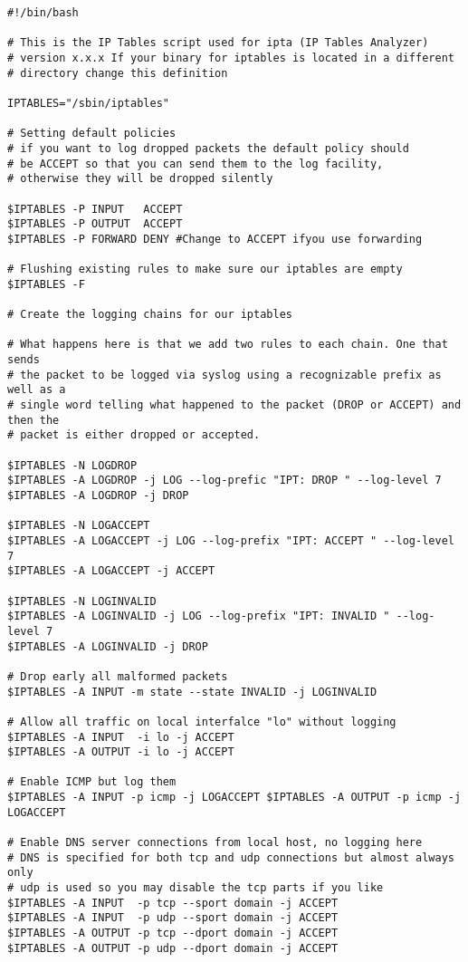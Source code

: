 \documentclass[english,twoside,openright,a4paper,12pt]{article}
\begin{document}
\begin{verbatim}
#!/bin/bash

# This is the IP Tables script used for ipta (IP Tables Analyzer) 
# version x.x.x If your binary for iptables is located in a different 
# directory change this definition

IPTABLES="/sbin/iptables"

# Setting default policies
# if you want to log dropped packets the default policy should 
# be ACCEPT so that you can send them to the log facility, 
# otherwise they will be dropped silently 

$IPTABLES -P INPUT   ACCEPT
$IPTABLES -P OUTPUT  ACCEPT
$IPTABLES -P FORWARD DENY #Change to ACCEPT ifyou use forwarding

# Flushing existing rules to make sure our iptables are empty 
$IPTABLES -F

# Create the logging chains for our iptables

# What happens here is that we add two rules to each chain. One that sends
# the packet to be logged via syslog using a recognizable prefix as well as a 
# single word telling what happened to the packet (DROP or ACCEPT) and then the 
# packet is either dropped or accepted.

$IPTABLES -N LOGDROP
$IPTABLES -A LOGDROP -j LOG --log-prefic "IPT: DROP " --log-level 7
$IPTABLES -A LOGDROP -j DROP

$IPTABLES -N LOGACCEPT
$IPTABLES -A LOGACCEPT -j LOG --log-prefix "IPT: ACCEPT " --log-level 7 
$IPTABLES -A LOGACCEPT -j ACCEPT

$IPTABLES -N LOGINVALID
$IPTABLES -A LOGINVALID -j LOG --log-prefix "IPT: INVALID " --log-level 7 
$IPTABLES -A LOGINVALID -j DROP

# Drop early all malformed packets
$IPTABLES -A INPUT -m state --state INVALID -j LOGINVALID

# Allow all traffic on local interfalce "lo" without logging 
$IPTABLES -A INPUT  -i lo -j ACCEPT
$IPTABLES -A OUTPUT -i lo -j ACCEPT

# Enable ICMP but log them
$IPTABLES -A INPUT -p icmp -j LOGACCEPT $IPTABLES -A OUTPUT -p icmp -j LOGACCEPT

# Enable DNS server connections from local host, no logging here
# DNS is specified for both tcp and udp connections but almost always only 
# udp is used so you may disable the tcp parts if you like
$IPTABLES -A INPUT  -p tcp --sport domain -j ACCEPT
$IPTABLES -A INPUT  -p udp --sport domain -j ACCEPT
$IPTABLES -A OUTPUT -p tcp --dport domain -j ACCEPT
$IPTABLES -A OUTPUT -p udp --dport domain -j ACCEPT


\end{verbatim}
\end{document}
